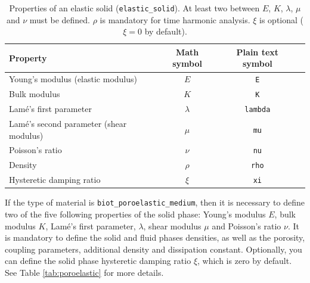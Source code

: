 \documentclass[a4paper,fleqn]{book}
\begin{document}
\begin{table}[h]
\centering
{\small
\begin{tabular}{lccl}
\textbf{Property} & \textbf{Math symbol} & \textbf{Plain text symbol} \\
\midrule
Young's modulus (elastic modulus)         & $E$       & \texttt{E}      \\
Bulk modulus                              & $K$       & \texttt{K}      \\
Lam\'e's first parameter                  & $\lambda$ & \texttt{lambda} \\
Lam\'e's second parameter (shear modulus) & $\mu$     & \texttt{mu}     \\
Poisson's ratio                           & $\nu$     & \texttt{nu}     \\
Density                                   & $\rho$    & \texttt{rho}    \\
Hysteretic damping ratio                  & $\xi$     & \texttt{xi}     
\end{tabular}
}
\caption{Properties of an elastic solid (\texttt{elastic\_solid}). At least two between $E$, $K$, $\lambda$, $\mu$ and $\nu$ must be defined. $\rho$ is mandatory for time harmonic analysis. $\xi$ is optional ($\xi=0$ by default).}
\label{tab:elastic}
\end{table}

If the type of material is \texttt{biot\_poroelastic\_medium}, then it is necessary to define two of the five following properties of the solid phase: Young's modulus $E$, bulk modulus $K$, Lam\'e's first parameter, $\lambda$, shear modulus $\mu$ and Poisson's ratio $\nu$. It is mandatory to define the solid and fluid phases densities, as well as the porosity, coupling parameters, additional density and dissipation constant. Optionally, you can define the solid phase hysteretic damping ratio $\xi$, which is zero by default. See Table \ref{tab:poroelastic} for more details.
\end{document}
